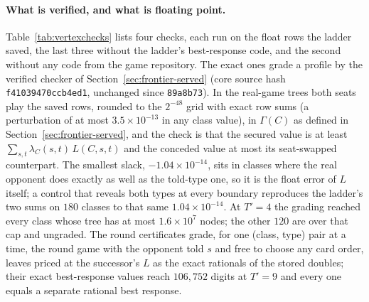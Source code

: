 \documentclass[11pt]{article}
\theoremstyle{plain}
\theoremstyle{definition}
\theoremstyle{remark}
\newcommand{\code}[1]{\texttt{\small #1}}
\begin{document}
\paragraph{What is verified, and what is floating point.}
Table~\ref{tab:vertexchecks} lists four checks, each run on the float
rows the ladder saved, the last three without the ladder's
best-response code, and the second without any code from the game
repository. The exact ones grade a profile by the verified checker of
Section~\ref{sec:frontier-served} (core source hash
\code{f41039470ccb4ed1}, unchanged since \code{89a8b73}). In the
real-game trees both seats play the saved rows, rounded to the
$2^{-48}$ grid with exact row sums (a perturbation of at most
$3.5\times10^{-13}$ in any class value), in $\Gamma(C)$ as defined in
Section~\ref{sec:frontier-served}, and the check is that the secured
value is at least $\sum_{s,t}\lambda_C(s,t)\,L(C,s,t)$ and the
conceded value at most its seat-swapped counterpart. The smallest slack,
$-1.04\times10^{-14}$, sits in classes where the real opponent does
exactly as well as the told-type one, so it is the float error of $L$
itself; a control that reveals both types at every boundary reproduces
the ladder's two sums on $180$ classes to that same
$1.04\times10^{-14}$. At $T'=4$ the grading reached every class whose
tree has at most $1.6\times10^{7}$ nodes; the other $120$ are over that
cap and ungraded. The round certificates grade, for one (class, type)
pair at a time, the round game with the opponent told $s$ and free to
choose any card order, leaves priced at the successor's $L$ as the
exact rationals of the stored doubles; their exact best-response values
reach $106{,}752$ digits at $T'=9$ and every one equals a separate
rational best response.
\end{document}
